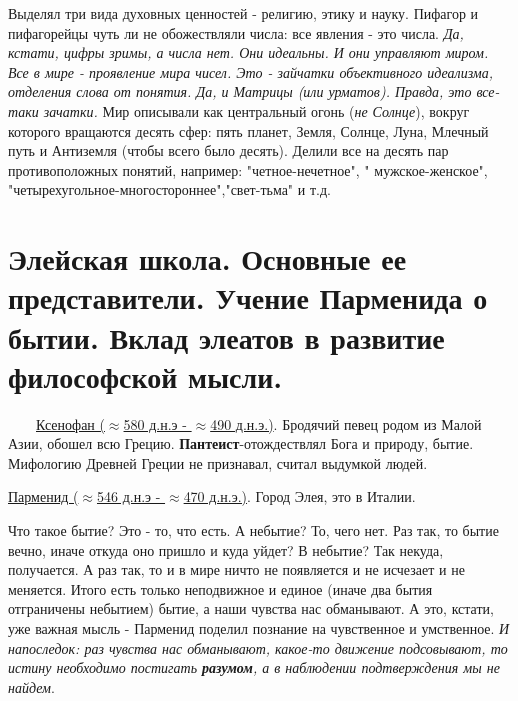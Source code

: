 \documentclass[12pt,a4paper]{article}
\begin{document}
Выделял три вида духовных ценностей - религию, этику и науку. Пифагор и пифагорейцы чуть ли не обожествляли числа: все явления - это числа. \textit{Да, кстати, цифры зримы, а числа нет. Они идеальны. И они управляют миром. Все в мире - проявление мира чисел. Это - зайчатки объективного идеализма, отделения слова от понятия. Да, и Матрицы (или урматов). Правда, это все-таки зачатки.} Мир описывали как центральный огонь (\textit{не Солнце}), вокруг которого вращаются десять сфер: пять планет, Земля, Солнце, Луна, Млечный путь и Антиземля (чтобы всего было десять). Делили все на десять пар противоположных понятий, например: "четное-нечетное", " мужское-женское", "четырехугольное-многостороннее","свет-тьма" и т.д.

\section{Элейская школа. Основные ее представители. Учение Парменида о бытии. Вклад элеатов в развитие философской мысли.}
\ \ \ \
\underline{Ксенофан ($\approx$580 д.н.э - $\approx$490 д.н.э.)}. Бродячий певец родом из Малой Азии, обошел всю Грецию. \textbf{Пантеист}-отождествлял Бога и природу, бытие. Мифологию Древней Греции не признавал, считал выдумкой людей.

\underline{Парменид ($\approx$546 д.н.э - $\approx$470 д.н.э.)}. Город Элея, это в Италии.


Что такое бытие? Это - то, что есть. А небытие? То, чего нет. Раз так, то бытие вечно, иначе откуда оно пришло и куда уйдет? В небытие? Так некуда, получается. А раз так, то и в мире ничто не появляется и не исчезает и не меняется. Итого есть только неподвижное и единое (иначе два бытия отграничены небытием) бытие, а наши чувства нас обманывают. А это, кстати, уже важная мысль - Парменид поделил познание на чувственное и умственное. \textit{И напоследок: раз чувства нас обманывают, какое-то движение подсовывают, то истину необходимо постигать \textbf{разумом}, а в наблюдении подтверждения мы не найдем}.
\end{document}

